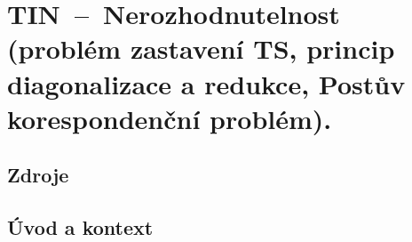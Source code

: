 

\graphicspath{{tin/chomskeho_hierarchie/figures}}


\chapter{TIN~--~Nerozhodnutelnost (problém zastavení TS, princip diagonalizace a redukce, Postův korespondenční problém).}


\section{Zdroje}

\begin{compactitem}
    \item {}
    \item {}
\end{compactitem}


\section{Úvod a kontext}

